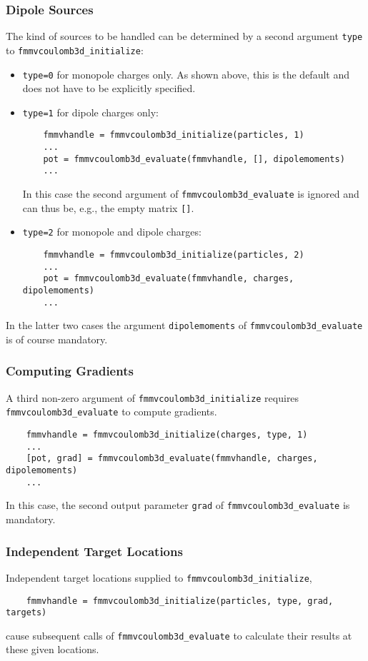 \subsubsection*{Dipole Sources}
The kind of sources to be handled can be determined by a second argument 
\verb|type| to \verb|fmmvcoulomb3d_initialize|:
\begin{itemize}
	\item \verb|type=0| for monopole charges only. As shown above, 
	this is the default and does not have to be explicitly specified.
	\item \verb|type=1| for dipole charges only:
\begin{verbatim}
    fmmvhandle = fmmvcoulomb3d_initialize(particles, 1)
    ...
    pot = fmmvcoulomb3d_evaluate(fmmvhandle, [], dipolemoments)
    ...
\end{verbatim}
	In this case the second argument of \verb|fmmvcoulomb3d_evaluate|
	is ignored and can thus be, e.g.,  
	the empty matrix \verb|[]|.
	\item \verb|type=2| for monopole and dipole charges:
\begin{verbatim}
    fmmvhandle = fmmvcoulomb3d_initialize(particles, 2)
    ...
    pot = fmmvcoulomb3d_evaluate(fmmvhandle, charges, dipolemoments)
    ...
\end{verbatim}
\end{itemize}
In the latter two cases the argument \verb|dipolemoments| of \verb|fmmvcoulomb3d_evaluate|
is of course mandatory.

\subsubsection*{Computing Gradients}
A third non-zero argument of \verb|fmmvcoulomb3d_initialize| requires
\verb|fmmvcoulomb3d_evaluate| to compute gradients. 
\begin{verbatim}
    fmmvhandle = fmmvcoulomb3d_initialize(charges, type, 1)
    ...
    [pot, grad] = fmmvcoulomb3d_evaluate(fmmvhandle, charges, dipolemoments)
    ...
\end{verbatim}
In this case, the second output parameter \verb|grad| of 
\verb|fmmvcoulomb3d_evaluate|
is mandatory.
\subsubsection*{Independent Target Locations}
Independent target locations supplied to \verb|fmmvcoulomb3d_initialize|,
\begin{verbatim}
    fmmvhandle = fmmvcoulomb3d_initialize(particles, type, grad, targets)
\end{verbatim}
cause subsequent calls of \verb|fmmvcoulomb3d_evaluate| to calculate their results
at these given locations.
